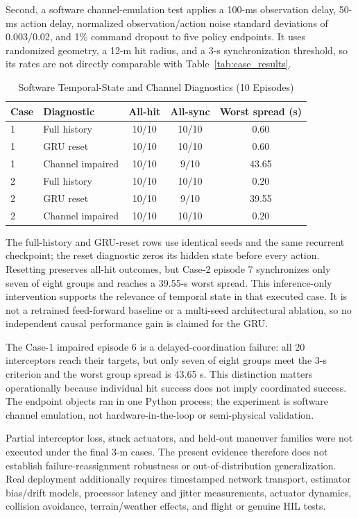 \documentclass[lettersize,journal]{IEEEtran}
\begin{document}
Second, a software channel-emulation test applies a 100-ms observation delay,
50-ms action delay, normalized observation/action noise standard deviations of
0.003/0.02, and 1\% command dropout to five policy endpoints. It uses randomized
geometry, a 12-m hit radius, and a 3-s synchronization threshold, so its rates
are not directly comparable with Table~\ref{tab:case_results}.

\begin{table}[!t]
\centering
\caption{Software Temporal-State and Channel Diagnostics (10 Episodes)}
\label{tab:channel_results}
\footnotesize
\begin{tabular}{llccc}
\toprule
Case & Diagnostic & All-hit & All-sync & Worst spread (s) \\
\midrule
1 & Full history & 10/10 & 10/10 & 0.60 \\
1 & GRU reset & 10/10 & 10/10 & 0.60 \\
1 & Channel impaired & 10/10 & 9/10 & 43.65 \\
2 & Full history & 10/10 & 10/10 & 0.20 \\
2 & GRU reset & 10/10 & 9/10 & 39.55 \\
2 & Channel impaired & 10/10 & 10/10 & 0.20 \\
\bottomrule
\end{tabular}
\end{table}

The full-history and GRU-reset rows use identical seeds and the same recurrent
checkpoint; the reset diagnostic zeros its hidden state before every action. Resetting
preserves all-hit outcomes, but Case-2 episode 7 synchronizes only seven of eight
groups and reaches a 39.55-s worst spread. This inference-only intervention supports
the relevance of temporal state in that executed case. It is not a retrained
feed-forward baseline or a multi-seed architectural ablation, so no independent
causal performance gain is claimed for the GRU.

The Case-1 impaired episode 6 is a delayed-coordination failure: all 20
interceptors reach their targets, but only seven of eight groups meet the 3-s
criterion and the worst group spread is 43.65 s. This distinction matters
operationally because individual hit success does not imply coordinated success.
The endpoint objects ran in one Python process; the experiment is software
channel emulation, not hardware-in-the-loop or semi-physical validation.

Partial interceptor loss, stuck actuators, and held-out maneuver families were
not executed under the final 3-m cases. The present evidence therefore does not
establish failure-reassignment robustness or out-of-distribution generalization.
Real deployment additionally requires timestamped network transport, estimator
bias/drift models, processor latency and jitter measurements, actuator dynamics,
collision avoidance, terrain/weather effects, and flight or genuine HIL tests.
\end{document}
